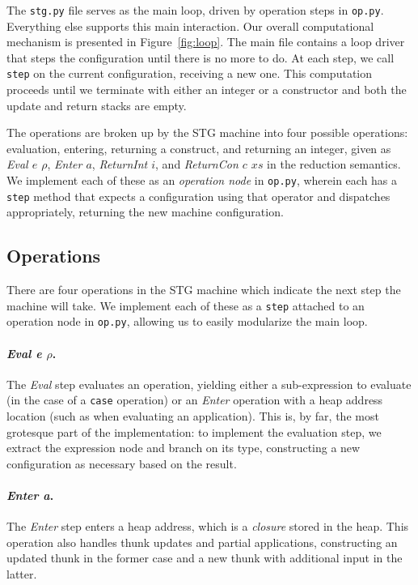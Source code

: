 \documentclass[preprint]{sigplanconf}
\begin{document}
The \lstinline{stg.py} file serves as the main loop, driven by operation steps
in \lstinline{op.py}. Everything else supports this main interaction.  
Our overall computational mechanism is presented in Figure~\ref{fig:loop}. The
main file contains a loop driver that steps the configuration until there is no
more to do. At each step, we call \lstinline{step} on the current configuration,
receiving a new one. This computation proceeds until we terminate with either
an integer or a constructor and both the update and return stacks are empty.

The operations are broken up by the STG machine into four possible operations:
evaluation, entering, returning a construct, and returning an integer, given
as \emph{Eval $e$ $\rho$}, \emph{Enter $a$}, \emph{ReturnInt $i$}, and
\emph{ReturnCon $c$ $xs$} in the reduction semantics. We implement each of these
as an \emph{operation node} in \lstinline{op.py}, wherein each has a
\lstinline{step} method that expects a configuration using that operator and
dispatches appropriately, returning the new machine configuration.

\subsection{Operations}

There are four operations in the STG machine which indicate the next
step the machine will take. We implement each of these as a \lstinline{step}
attached to an operation node in \lstinline{op.py}, allowing us to easily
modularize the main loop.

\paragraph{\textit{Eval e $\rho$}.}
The \textit{Eval} step evaluates an operation, yielding either a 
sub-expression to evaluate (in the case of a \lstinline{case} operation)
or an \textit{Enter} operation with a heap address location (such as when
evaluating an application).
This is, by far, the most grotesque part of the implementation: to implement the
evaluation step, we extract the expression node and branch on its type,
constructing a new configuration as necessary based on the result.

\paragraph{\textit{Enter a}.}
The \textit{Enter} step enters a heap address, which is a \emph{closure} stored
in the heap. This operation also handles thunk updates and partial applications,
constructing an updated thunk in the former case and a new thunk with additional
input in the latter.  
\end{document}
